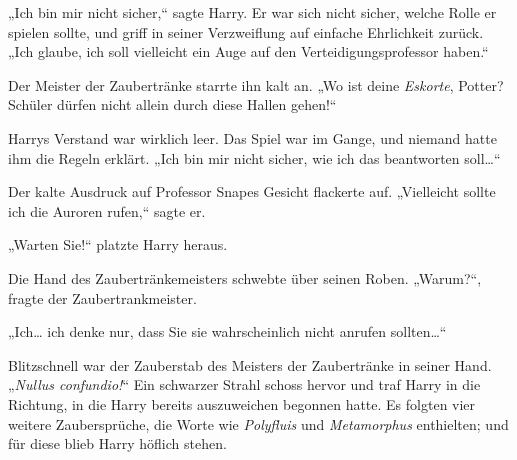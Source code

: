 „Ich bin mir nicht sicher,“ sagte Harry.
Er war sich nicht sicher, welche Rolle er spielen sollte, und griff in seiner Verzweiflung auf einfache Ehrlichkeit zurück.
„Ich glaube, ich soll vielleicht ein Auge auf den Verteidigungsprofessor haben.“

Der Meister der Zaubertränke starrte ihn kalt an.
„Wo ist deine \emph{Eskorte}, Potter? Schüler dürfen nicht allein durch diese Hallen gehen!“

Harrys Verstand war wirklich leer. Das Spiel war im Gange, und niemand hatte ihm die Regeln erklärt. „Ich bin mir nicht sicher, wie ich das beantworten soll…“

Der kalte Ausdruck auf Professor Snapes Gesicht flackerte auf. „Vielleicht sollte ich die Auroren rufen,“ sagte er.

„Warten Sie!“ platzte Harry heraus.

Die Hand des Zaubertränkemeisters schwebte über seinen Roben.
„Warum?“, fragte der Zaubertrankmeister.

„Ich… ich denke nur, dass Sie sie wahrscheinlich nicht anrufen sollten…“

Blitzschnell war der Zauberstab des Meisters der Zaubertränke in seiner Hand.
„\emph{Nullus confundio!}“
Ein schwarzer Strahl schoss hervor und traf Harry in die Richtung, in die Harry bereits auszuweichen begonnen hatte. Es folgten vier weitere Zaubersprüche, die Worte wie \emph{Polyfluis} und \emph{Metamorphus} enthielten; und für diese blieb Harry höflich stehen.

